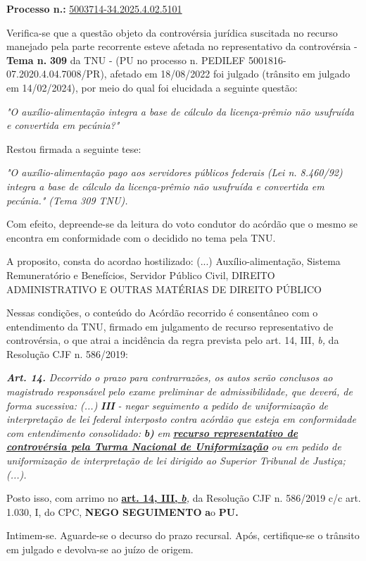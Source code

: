\documentclass[12pt]{article}
\begin{document}
\justifying
\noindent \textbf{Processo n.: }\uline{5003714-34.2025.4.02.5101}

\noindent Verifica-se que a questão objeto da controvérsia jurídica suscitada no recurso manejado pela parte recorrente esteve afetada no representativo da controvérsia - \textbf{Tema n. }\textbf{309} da TNU - (PU no processo n. PEDILEF 5001816-07.2020.4.04.7008/PR),  afetado em 18/08/2022 foi julgado (trânsito em julgado em 14/02/2024), por meio do qual foi elucidada a seguinte questão:

\noindent \textit{"O auxílio-alimentação integra a base de cálculo da licença-prêmio não usufruída e convertida em pecúnia?"}

\noindent Restou firmada a seguinte tese:

\noindent \textit{"O auxílio-alimentação pago aos servidores públicos federais (Lei n. 8.460/92) integra a base de cálculo da licença-prêmio não usufruída e convertida em pecúnia." (Tema 309 TNU).}

\noindent Com efeito, depreende-se da leitura do voto condutor do acórdão que o mesmo se encontra em conformidade com o decidido no  tema pela TNU.

\noindent A proposito, consta do acordao hostilizado: (...) Auxílio-alimentação, Sistema Remuneratório e Benefícios, Servidor Público Civil, DIREITO ADMINISTRATIVO E OUTRAS MATÉRIAS DE DIREITO PÚBLICO

\noindent Nessas condições, o conteúdo do Acórdão recorrido é consentâneo com o entendimento da TNU, firmado em julgamento de recurso representativo de controvérsia, o que atrai a incidência da regra prevista pelo art. 14, III, \textit{b,} da Resolução CJF n. 586/2019:

\noindent \textit{\textbf{Art. 14.}}\textit{ Decorrido o prazo para contrarrazões, os autos serão conclusos ao magistrado responsável pelo exame preliminar de admissibilidade, que deverá, de forma sucessiva: (...) }\textit{\textbf{III }}\textit{- negar seguimento a pedido de uniformização de interpretação de lei federal interposto contra acórdão que esteja em conformidade com entendimento consolidado: }\textit{\textbf{b)}}\textit{ em }\uline{\textit{\textbf{recurso representativo de controvérsia pela Turma Nacional de Uniformização}}}\textit{ ou em pedido de uniformização de interpretação de lei dirigido ao Superior Tribunal de Justiça;(...).}

\noindent Posto isso, com arrimo no \uline{\textbf{art. 14, III, }}\uline{\textit{\textbf{b}}}\textit{,} da Resolução CJF n. 586/2019 c/c art. 1.030, I, do CPC, \textbf{NEGO SEGUIMENTO }\textbf{a}o\textbf{ PU}\textbf{.}

\noindent Intimem-se. Aguarde-se o decurso do prazo recursal. Após, certifique-se o trânsito em julgado e devolva-se ao juízo de origem.
\end{document}
